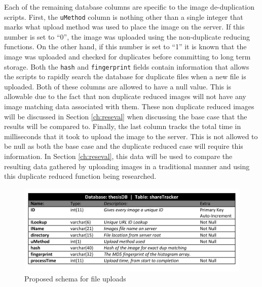 Each of the remaining database columns are specific to the image de-duplication scripts. First, the {\tt uMethod} column is nothing other than a single integer that marks what upload method was used to place the image on the server. If this number is set to ``0'', the image was uploaded using the non-duplicate reducing functions. On the other hand, if this number is set to ``1'' it is known that the image was uploaded and checked for duplicates before committing to long term storage. Both the {\tt hash} and {\tt fingerprint} fields contain information that allows the scripts to rapidly search the database for duplicate files when a new file is uploaded.  Both of these columns are allowed to have a null value. This is allowable due to the fact that non duplicate reduced images will not have any image matching data associated with them. These non duplicate reduced images will be discussed in Section \ref{ch:reseval} when discussing the base case that the results will be compared to. Finally, the last column tracks the total time in milliseconds that it took to upload the image to the server. This is not allowed to be null as both the base case and the duplicate reduced case will require this information. In Section \ref{ch:reseval}, this data will be used to compare the resulting data gathered by uploading images in a traditional manner and using this duplicate reduced function being researched.

\begin{figure}[htbp]
\centering
\includegraphics[width=6in]{schema}
\caption{Proposed schema for file uploads}
\label{fig:schema}
\end{figure}

